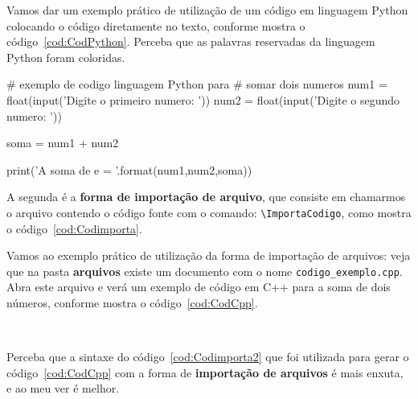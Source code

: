 \begin{Codigo}[language=tex, caption=Forma direta de acrescentar Códigos no texto, label=cod:CodDireta]
    \begin{codigo}[language=Nome da Linguagem,
        caption=Titulo do Codigo,
        label=cod:LabelCodigo]
    \end{codigo}
\end{Codigo}

Vamos dar um exemplo prático de utilização de um código em linguagem Python colocando o código diretamente no texto, conforme mostra o código~\ref{cod:CodPython}. Perceba que as palavras reservadas da linguagem Python foram coloridas.

\begin{Codigo}[language=Python, caption=Programa em Python para Somar Dois Números, label=cod:CodPython]
    # exemplo de codigo linguagem  Python para
    # somar dois numeros
    num1 = float(input('Digite o primeiro numero: '))
    num2 = float(input('Digite o segundo numero: '))

    soma = num1 + num2

    print('A soma de {} e {} = {}'.format(num1,num2,soma))
\end{Codigo}

A segunda é a {\bf forma de importação de arquivo}, que consiste em chamarmos o arquivo contendo o código fonte com o comando: \verb|\ImportaCodigo|, como mostra o código~\ref{cod:Codimporta}.

\begin{Codigo}[language=tex, caption=Forma de importar Códigos para o texto, label=cod:Codimporta]
\end{Codigo}

Vamos ao exemplo prático de utilização da forma de importação de arquivos: veja que na pasta {\bf arquivos} existe um documento com o nome \verb|codigo_exemplo.cpp|. Abra este arquivo e verá um exemplo de código em C++ para a soma de dois números, conforme mostra o código~\ref{cod:CodCpp}.



\pagebreak
~
\vspace{8mm}

Perceba que a sintaxe do código~\ref{cod:Codimporta2} que foi utilizada para gerar o código~\ref{cod:CodCpp} com a forma de {\bf importação de arquivos} é mais enxuta, e ao meu ver é melhor.    


